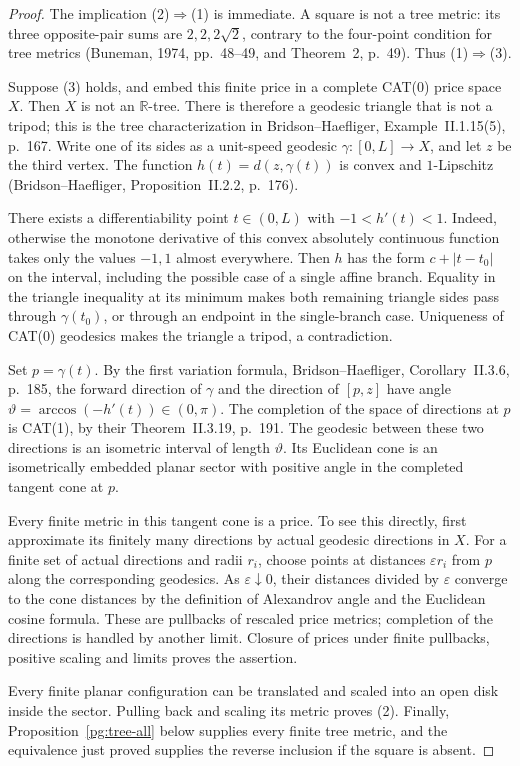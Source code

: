 \begin{proof}
The implication (2)$\Rightarrow$(1) is immediate. A square is not a tree
metric: its three opposite-pair sums are $2,2,2\sqrt2$, contrary to the
four-point condition for tree metrics (Buneman, 1974, pp.~48--49, and
Theorem~2, p.~49). Thus (1)$\Rightarrow$(3).

Suppose (3) holds, and embed this finite price in a complete CAT(0) price
space $X$. Then $X$ is not an $\mathbb R$-tree. There is therefore a
geodesic triangle that is not a tripod; this is the tree characterization
in Bridson--Haefliger, Example~II.1.15(5), p.~167. Write one of its sides
as a unit-speed geodesic $\gamma:[0,L]\to X$, and let $z$ be the third
vertex. The function $h(t)=d(z,\gamma(t))$ is convex and $1$-Lipschitz
(Bridson--Haefliger, Proposition~II.2.2, p.~176).

There exists a differentiability point $t\in(0,L)$ with
$-1<h'(t)<1$. Indeed, otherwise the monotone derivative of this convex
absolutely continuous function takes only the values $-1,1$ almost
everywhere. Then $h$ has the form $c+|t-t_0|$ on the interval, including
the possible case of a single affine branch. Equality in the triangle
inequality at its minimum makes both remaining triangle sides pass
through $\gamma(t_0)$, or through an endpoint in the single-branch case.
Uniqueness of CAT(0) geodesics makes the triangle a tripod, a contradiction.

Set $p=\gamma(t)$. By the first variation formula,
Bridson--Haefliger, Corollary~II.3.6, p.~185, the forward direction of
$\gamma$ and the direction of $[p,z]$ have angle
$\vartheta=\arccos(-h'(t))\in(0,\pi)$. The completion of the space
of directions at $p$ is CAT(1), by their Theorem~II.3.19, p.~191. The
geodesic between these two directions is an isometric interval of length
$\vartheta$. Its Euclidean cone is an isometrically embedded planar
sector with positive angle in the completed tangent cone at $p$.

Every finite metric in this tangent cone is a price. To see this directly,
first approximate its finitely many directions by actual geodesic
directions in $X$. For a finite set of actual directions and radii
$r_i$, choose points at distances $\varepsilon r_i$ from $p$ along
the corresponding geodesics. As $\varepsilon\downarrow0$, their
distances divided by $\varepsilon$ converge to the cone distances by
the definition of Alexandrov angle and the Euclidean cosine formula.
These are pullbacks of rescaled price metrics; completion of the
directions is handled by another limit. Closure of prices under finite
pullbacks, positive scaling and limits proves the assertion.

Every finite planar configuration can be translated and scaled into an
open disk inside the sector. Pulling back and scaling its metric proves
(2). Finally, Proposition~\ref{pg:tree-all} below supplies every
finite tree metric, and the equivalence just proved supplies the reverse
inclusion if the square is absent.
\end{proof}

